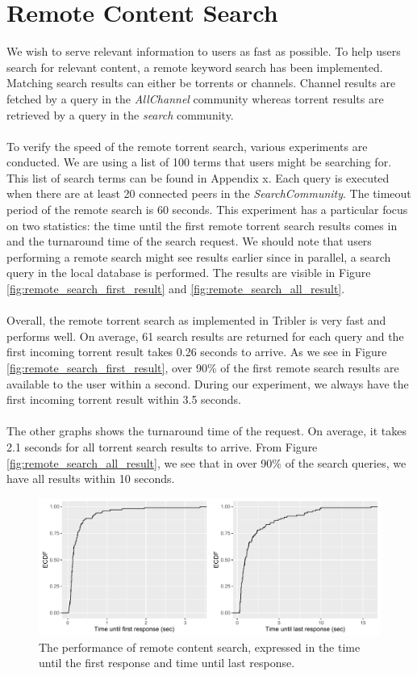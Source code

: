\section{Remote Content Search}
We wish to serve relevant information to users as fast as possible. To help users search for relevant content, a remote keyword search has been implemented. Matching search results can either be torrents or channels. Channel results are fetched by a query in the \emph{AllChannel} community whereas torrent results are retrieved by a query in the \emph{search} community.\\\\
To verify the speed of the remote torrent search, various experiments are conducted. We are using a list of 100 terms that users might be searching for. This list of search terms can be found in Appendix x. Each query is executed when there are at least 20 connected peers in the \emph{SearchCommunity}. The timeout period of the remote search is 60 seconds. This experiment has a particular focus on two statistics: the time until the first remote torrent search results comes in and the turnaround time of the search request. We should note that users performing a remote search might see results earlier since in parallel, a  search query in the local database is performed. The results are visible in Figure \ref{fig:remote_search_first_result} and \ref{fig:remote_search_all_result}.\\\\
Overall, the remote torrent search as implemented in Tribler is very fast and performs well. On average, 61 search results are returned for each query and the first incoming torrent result takes 0.26 seconds to arrive. As we see in Figure \ref{fig:remote_search_first_result}, over 90\% of the first remote search results are available to the user within a second. During our experiment, we always have the first incoming torrent result within 3.5 seconds.\\\\
The other graphs shows the turnaround time of the request. On average, it takes 2.1 seconds for all torrent search results to arrive. From Figure \ref{fig:remote_search_all_result}, we see that in over 90\% of the search queries, we have all results within 10 seconds.

\begin{figure}[!h]
	\centering
	\includegraphics[width=1.0\columnwidth]{images/experiments/cdf_remote_search}
	\caption{The performance of remote content search, expressed in the time until the first response and time until last response.}
	\label{fig:remote_search}
\end{figure}

